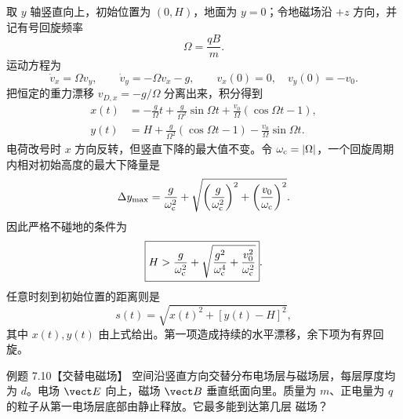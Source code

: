 \begin{xesolution}
取 $y$ 轴竖直向上，初始位置为 $(0,H)$，地面为 $y=0$；令地磁场沿 $+z$ 方向，并记有号回旋频率
\[
  \Omega=\frac{qB}{m}.
\]
运动方程为
\[
  \dot v_x=\Omega v_y,
  \qquad
  \dot v_y=-\Omega v_x-g,
  \qquad v_x(0)=0,\quad v_y(0)=-v_0.
\]
把恒定的重力漂移 $v_{D,x}=-g/\Omega$ 分离出来，积分得到
\begin{align}
  x(t)&=-\frac g\Omega t+\frac g{\Omega^2}\sin\Omega t
       +\frac{v_0}{\Omega}(\cos\Omega t-1),\\
  y(t)&=H+\frac g{\Omega^2}(\cos\Omega t-1)
       -\frac{v_0}{\Omega}\sin\Omega t.
\end{align}
电荷改号时 $x$ 方向反转，但竖直下降的最大值不变。令
$\omega_{\rm c}=|\Omega|$，一个回旋周期内相对初始高度的最大下降量是
\begin{equation}
  \Delta y_{\max}=\frac g{\omega_{\rm c}^2}
  +\sqrt{\left(\frac g{\omega_{\rm c}^2}\right)^2
  +\left(\frac{v_0}{\omega_{\rm c}}\right)^2}.
\end{equation}
因此严格不碰地的条件为
\begin{equation}
  \boxed{H>\frac g{\omega_{\rm c}^2}
  +\sqrt{\frac{g^2}{\omega_{\rm c}^4}+\frac{v_0^2}{\omega_{\rm c}^2}}}.
\end{equation}
任意时刻到初始位置的距离则是
\begin{equation}
  \boxed{s(t)=\sqrt{x(t)^2+[y(t)-H]^2}},
\end{equation}
其中 $x(t),y(t)$ 由上式给出。第一项造成持续的水平漂移，余下项为有界回旋。

\gravityDriftDiagram
\end{xesolution}

\Needspace{0.44\textheight}
\begin{origexamplebox}{例题 7.10【交替电磁场】}
空间沿竖直方向交替分布电场层与磁场层，每层厚度均为 $d$。电场 $\vect E$ 向上，磁场 $\vect B$
垂直纸面向里。质量为 $m$、正电量为 $q$ 的粒子从第一电场层底部由静止释放。它最多能到达第几层
磁场？
\end{origexamplebox}

